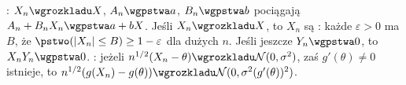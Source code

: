:  $X_n \wgrozkladu X$, $A_n \wgpstwa a$, $B_n \wgpstwa b$ pociągają $A_n + B_nX_n \wgpstwa a + bX$.
Jeśli $X_n \wgrozkladu X$, to $X_n$ są : każde $\varepsilon > 0$ ma $B$, że $\pstwo (|X_n| \le B) \ge 1 - \varepsilon$ dla dużych $n$.
Jeśli jeszcze $Y_n \wgpstwa 0$, to $X_nY_n \wgpstwa 0$.
: jeżeli $n^{1/2} (X_n - \theta) \wgrozkladu \mathcal N(0, \sigma^2)$, zaś $g'(\theta) \neq 0$ istnieje, to $n^{1/2} (g(X_n) - g(\theta)) \wgrozkladu \mathcal N(0, \sigma^2 (g'(\theta))^2)$.